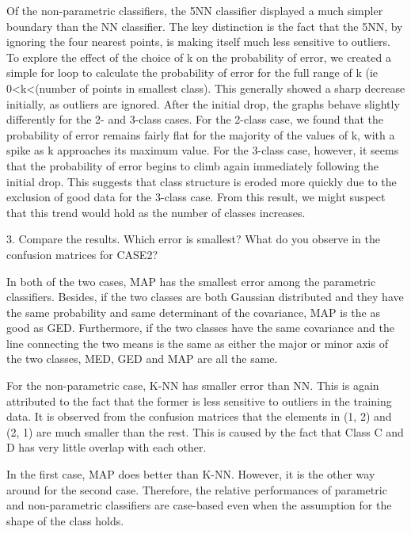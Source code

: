 Of the non-parametric classifiers, the 5NN classifier displayed a much simpler boundary than the NN classifier.  The key distinction is the fact that the 5NN, by ignoring the four nearest points, is making itself much less sensitive to outliers.  To explore the effect of the choice of k on the probability of error, we created a simple for loop to calculate the probability of error for the full range of k (ie 0<k<(number of points in smallest class).  This generally showed a sharp decrease initially, as outliers are ignored.  After the initial drop, the graphs behave slightly differently for the 2- and 3-class cases.  For the 2-class case, we found that the probability of error remains fairly flat for the majority of the values of k, with a spike as k approaches its maximum value.  For the 3-class case, however, it seems that the probability of error begins to climb again immediately following the initial drop.  This suggests that class structure is eroded more quickly due to the exclusion of good data for the 3-class case.  From this result, we might suspect that this trend would hold as the number of classes increases.

3.	Compare the results. Which error is smallest? What do you observe in the confusion matrices for CASE2?

In both of the two cases, MAP has the smallest error among the parametric classifiers. Besides, if the two classes are both Gaussian distributed and they have the same probability and same determinant of the covariance, MAP is the as good as GED. Furthermore, if the two classes have the same covariance and the line connecting the two means is the same as either the major or minor axis of the two classes, MED, GED and MAP are all the same.

For the non-parametric case, K-NN has smaller error than NN. This is again attributed to the fact that the former is less sensitive to outliers in the training data. It is observed from the confusion matrices that the elements in (1, 2) and (2, 1) are much smaller than the rest. This is caused by the fact that Class C and D has very little overlap with each other.

In the first case, MAP does better than K-NN. However, it is the other way around for the second case. Therefore, the relative performances of parametric and non-parametric classifiers are case-based even when the assumption for the shape of the class holds.

